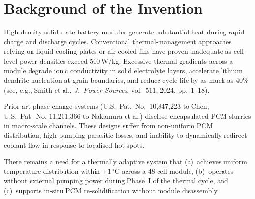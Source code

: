 \section{Background of the Invention}

High-density solid-state battery modules generate substantial heat during rapid charge and
discharge cycles. Conventional thermal-management approaches relying on liquid cooling
plates or air-cooled fins have proven inadequate as cell-level power densities exceed
\mbox{500\,W/kg}. Excessive thermal gradients across a module degrade ionic conductivity in
solid electrolyte layers, accelerate lithium dendrite nucleation at grain boundaries, and
reduce cycle life by as much as 40\% (see, e.g., Smith et al., \textit{J.~Power Sources},
vol.~511, 2024, pp.~1--18).

Prior art phase-change systems (U.S.~Pat.\ No.~10,847,223 to Chen; U.S.~Pat.\ No.
11,201,366 to Nakamura et al.) disclose encapsulated PCM slurries in macro-scale channels.
These designs suffer from non-uniform PCM distribution, high pumping parasitic losses, and
inability to dynamically redirect coolant flow in response to localised hot spots.

There remains a need for a thermally adaptive system that (a)~achieves uniform temperature
distribution within $\pm 1\,^{\circ}\mathrm{C}$ across a 48-cell module, (b)~operates without
external pumping power during Phase~I of the thermal cycle, and (c)~supports in-situ PCM
re-solidification without module disassembly.

